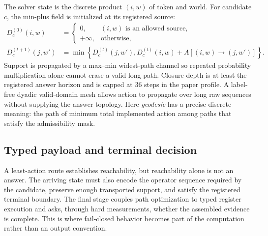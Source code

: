 \documentclass[11pt]{article}
\begin{document}
The solver state is the discrete product $(i,w)$ of token and world. For
candidate $c$, the min-plus field is initialized at its registered source:
\begin{align}
D_c^{(0)}(i,w) &=
\begin{cases}0,&(i,w)\text{ is an allowed source},\\
+\infty,&\text{otherwise},\end{cases}\\
D_c^{(t+1)}(j,w') &= \min\left\{D_c^{(t)}(j,w'),
D_c^{(t)}(i,w)+A[(i,w)\rightarrow(j,w')]\right\}.
\label{eq:minplus}
\end{align}
Support is propagated by a max--min widest-path channel so repeated
probability multiplication alone cannot erase a valid long path. Closure depth
is at least the registered answer horizon and is capped at 36 steps in the
paper profile. A label-free dyadic valid-domain mesh allows action to
propagate over long raw sequences without supplying the answer topology.
Here \emph{geodesic} has a precise discrete meaning: the path of minimum total
implemented action among paths that satisfy the admissibility mask.

\subsection{Typed payload and terminal decision}

A least-action route establishes reachability, but reachability alone is not an
answer. The arriving state must also encode the operator sequence required by
the candidate, preserve enough transported support, and satisfy the registered
terminal boundary. The final stage couples path optimization to typed register
execution and asks, through hard measurements, whether the assembled evidence
is complete. This is where fail-closed behavior becomes part of the computation
rather than an output convention.
\end{document}
